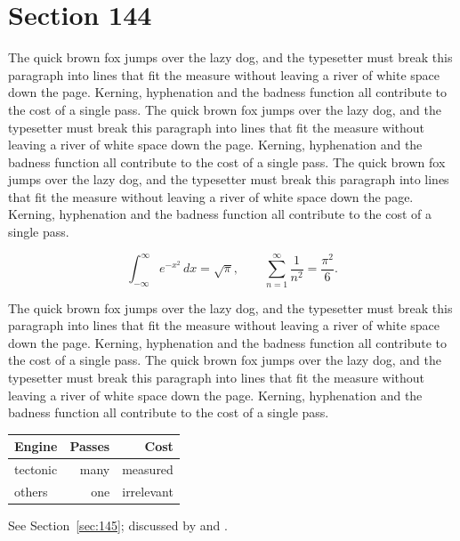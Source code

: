 \documentclass{article}
\begin{document}
\section{Section 144}
\label{sec:144}
The quick brown fox jumps over the lazy dog, and the typesetter must break this paragraph into lines that fit the measure without leaving a river of white space down the page. Kerning, hyphenation and the badness function all contribute to the cost of a single pass. The quick brown fox jumps over the lazy dog, and the typesetter must break this paragraph into lines that fit the measure without leaving a river of white space down the page. Kerning, hyphenation and the badness function all contribute to the cost of a single pass. The quick brown fox jumps over the lazy dog, and the typesetter must break this paragraph into lines that fit the measure without leaving a river of white space down the page. Kerning, hyphenation and the badness function all contribute to the cost of a single pass. 

\begin{equation}\label{eq:144}
\int_{-\infty}^{\infty} e^{-x^{2}}\,dx = \sqrt{\pi}, \qquad
\sum_{n=1}^{\infty} \frac{1}{n^{2}} = \frac{\pi^{2}}{6}.
\end{equation}

The quick brown fox jumps over the lazy dog, and the typesetter must break this paragraph into lines that fit the measure without leaving a river of white space down the page. Kerning, hyphenation and the badness function all contribute to the cost of a single pass. The quick brown fox jumps over the lazy dog, and the typesetter must break this paragraph into lines that fit the measure without leaving a river of white space down the page. Kerning, hyphenation and the badness function all contribute to the cost of a single pass. 

\begin{center}
\begin{tabular}{lrr}
\toprule
Engine & Passes & Cost \\
\midrule
tectonic & many & measured \\
others & one & irrelevant \\
\bottomrule
\end{tabular}
\end{center}

See Section~\ref{sec:145}; discussed by \textcite{k5} and \textcite{l2}.
\end{document}
